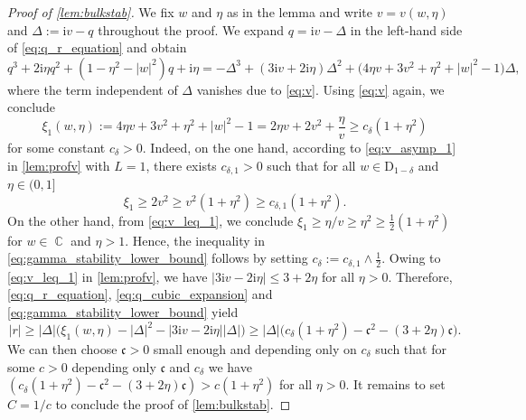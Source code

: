 \documentclass[10pt,a4paper]{amsart}
\DeclareMathOperator{\CC}{\mathbb{C}}
\newcommand{\ii}{\mathrm{i}}
\newcommand{\abs}[1]{\left| #1 \right|}
\numberwithin{equation}{section}
\begin{document}
	\begin{proof}[Proof of \cref{lem:bulkstab}]
		We fix $w$ and $\eta$ as in the lemma and write $v=v(w, \eta)$ and $\Delta :=\ii v - q$ throughout the proof. We expand $q = \ii v - \Delta$ in the left-hand side of \eqref{eq:q_r_equation} and obtain
		\begin{equation}\label{eq:q_cubic_expansion} 
			q^3 + 2\ii\eta q^2 + \left(1-\eta^2 - |w|^2 \right) q +\ii \eta = -\Delta^3 + ( 3 \ii v + 2\ii \eta) \Delta^2 + \bigl( 4 \eta v + 3 v^{2} + \eta^2 + \left|w\right|^2 -1 \bigr) \Delta, 
		\end{equation}
		where the term independent of $\Delta$ vanishes due to \eqref{eq:v}. 
		Using \eqref{eq:v} again, we conclude 
		\begin{equation}\label{eq:gamma_stability_lower_bound} 
			\xi_1(w,\eta):= 4 \eta v + 3 v^{2} + \eta^2 + \left|w\right|^2 -1= 2\eta v + 2v^2 + \frac{\eta}{v} \ge c_{\delta}( 1 + \eta^2)
		\end{equation}
		for some constant $c_{\delta}>0$. Indeed, on the one hand, according to \eqref{eq:v_asymp_1} in \cref{lem:profv} with $L=1$, there exists $c_{\delta,1}>0$ such that for all $w \in \mathrm{D}_{1-\delta}$ and $\eta \in (0,1]$
		\begin{equation}
			\xi_1 \ge 2 v^2 \ge v^2 (1+ \eta^2) \ge c_{\delta,1} (1+ \eta^2).
		\end{equation}
		On the other hand, from \eqref{eq:v_leq_1}, we conclude $\xi_1 \ge {\eta}/{v} \ge \eta^2 \ge \frac{1}{2} (1 + \eta^2)$ for $w \in \CC$ and $\eta >1$. Hence, the inequality in \eqref{eq:gamma_stability_lower_bound} follows by setting
		$c_{\delta}:=c_{\delta,1} \land \frac{1}{2}$.
		Owing to \eqref{eq:v_leq_1} in \cref{lem:profv}, we have $\abs{3\ii v - 2 \ii \eta} \leq 3 + 2\eta$ for all $\eta>0$.  
		Therefore, \eqref{eq:q_r_equation}, \eqref{eq:q_cubic_expansion} and \eqref{eq:gamma_stability_lower_bound} yield 
		\begin{equation}
			|r| \ge \left| \Delta \right| \bigl( \xi_1(w,\eta) - \left|\Delta\right|^2 - |3 \ii v -2 \ii \eta| \left|\Delta\right| \bigr) \ge  \left| \Delta \right| \bigl( c_{\delta}(1 + \eta^2) - \mathfrak{c}^2 - (3 + 2 \eta)\mathfrak{c} \bigr).
		\end{equation}
		We can then choose $\mathfrak{c}>0$ small enough and depending only on $c_{\delta}$ such that for some $c>0$ depending only $\mathfrak{c}$ and $c_{\delta}$ we have $\left( c_{\delta}(1 + \eta^2) - \mathfrak{c}^2 - (3 + 2 \eta)\mathfrak{c} \right) > c(1+ \eta^2)$ for all $\eta >0$. It remains to set $C= 1/c$ to conclude the proof of \cref{lem:bulkstab}.
	\end{proof}
	
\end{document}
